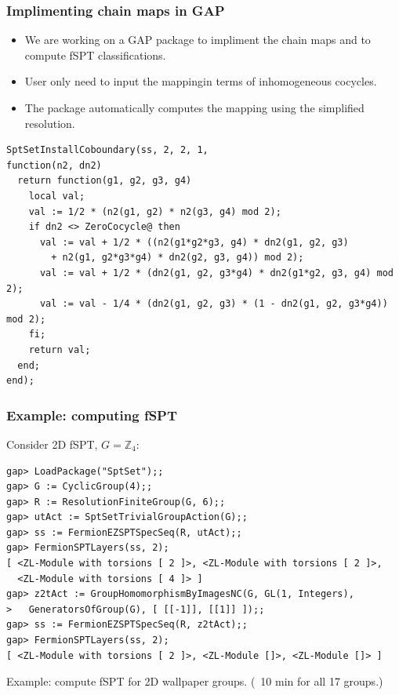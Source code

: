 \documentclass[xcolor=table, 11pt, aspectratio=1610]{beamer}
\begin{document}
\begin{frame}[fragile]
	\frametitle{Implimenting chain maps in GAP}
	\begin{itemize}
		\item We are working on a GAP package to impliment the chain maps and to compute fSPT classifications.
		\item User only need to input the mappingin terms of inhomogeneous cocycles.
		\item The package automatically computes the mapping using the simplified resolution.
	\end{itemize}
\begin{lstlisting}[basicstyle=\footnotesize,morekeywords={function,return,local,if,fi,then,end},showspaces=false,showtabs=false, keywordstyle=\color{blue}]
SptSetInstallCoboundary(ss, 2, 2, 1,
function(n2, dn2)
  return function(g1, g2, g3, g4)
    local val;
    val := 1/2 * (n2(g1, g2) * n2(g3, g4) mod 2);
    if dn2 <> ZeroCocycle@ then
      val := val + 1/2 * ((n2(g1*g2*g3, g4) * dn2(g1, g2, g3)
        + n2(g1, g2*g3*g4) * dn2(g2, g3, g4)) mod 2);
      val := val + 1/2 * (dn2(g1, g2, g3*g4) * dn2(g1*g2, g3, g4) mod 2);
      val := val - 1/4 * (dn2(g1, g2, g3) * (1 - dn2(g1, g2, g3*g4)) mod 2);
    fi;
    return val;
  end;
end);
\end{lstlisting}
\end{frame}

\begin{frame}[fragile]
	\frametitle{Example: computing fSPT}
	Consider 2D fSPT, $G=\mathbb Z_4$:
\begin{lstlisting}[basicstyle=\footnotesize]
gap> LoadPackage("SptSet");;
gap> G := CyclicGroup(4);;
gap> R := ResolutionFiniteGroup(G, 6);;
gap> utAct := SptSetTrivialGroupAction(G);;
gap> ss := FermionEZSPTSpecSeq(R, utAct);;
gap> FermionSPTLayers(ss, 2);
[ <ZL-Module with torsions [ 2 ]>, <ZL-Module with torsions [ 2 ]>,
  <ZL-Module with torsions [ 4 ]> ]
gap> z2tAct := GroupHomomorphismByImagesNC(G, GL(1, Integers),
>   GeneratorsOfGroup(G), [ [[-1]], [[1]] ]);;
gap> ss := FermionEZSPTSpecSeq(R, z2tAct);;
gap> FermionSPTLayers(ss, 2);
[ <ZL-Module with torsions [ 2 ]>, <ZL-Module []>, <ZL-Module []> ]
\end{lstlisting}

Example: compute fSPT for 2D wallpaper groups. (~10 min for all 17 groups.)
\end{frame}
\end{document}

